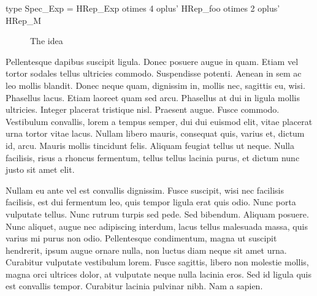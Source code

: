 \begin{code}
type Spec_Exp  =       HRep_Exp  otimes 4
               oplus'  HRep_foo  otimes 2
               oplus'  HRep_M
\end{code}


\begin{figure}[b]
  \centering
  
  \caption{The idea}
\end{figure}

Pellentesque dapibus suscipit ligula. Donec posuere augue in quam. Etiam vel
tortor sodales tellus ultricies commodo. Suspendisse potenti. Aenean in sem ac
leo mollis blandit. Donec neque quam, dignissim in, mollis nec, sagittis eu,
wisi. Phasellus lacus. Etiam laoreet quam sed arcu. Phasellus at dui in ligula
mollis ultricies. Integer placerat tristique nisl. Praesent augue. Fusce
commodo. Vestibulum convallis, lorem a tempus semper, dui dui euismod elit,
vitae placerat urna tortor vitae lacus. Nullam libero mauris, consequat quis,
varius et, dictum id, arcu. Mauris mollis tincidunt felis. Aliquam feugiat
tellus ut neque. Nulla facilisis, risus a rhoncus fermentum, tellus tellus
lacinia purus, et dictum nunc justo sit amet elit.

Nullam eu ante vel est convallis dignissim. Fusce suscipit, wisi nec facilisis
facilisis, est dui fermentum leo, quis tempor ligula erat quis odio. Nunc porta
vulputate tellus. Nunc rutrum turpis sed pede. Sed bibendum. Aliquam posuere.
Nunc aliquet, augue nec adipiscing interdum, lacus tellus malesuada massa, quis
varius mi purus non odio. Pellentesque condimentum, magna ut suscipit hendrerit,
ipsum augue ornare nulla, non luctus diam neque sit amet urna. Curabitur
vulputate vestibulum lorem. Fusce sagittis, libero non molestie mollis, magna
orci ultrices dolor, at vulputate neque nulla lacinia eros. Sed id ligula quis
est convallis tempor. Curabitur lacinia pulvinar nibh. Nam a sapien.


